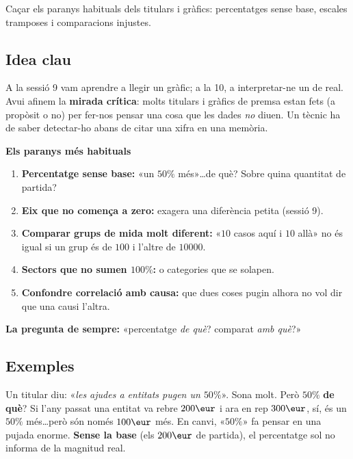 %
{Caçar els paranys habituals dels titulars i gràfics: percentatges sense base, escales tramposes i comparacions injustes.}

\subsection{Idea clau}

A la sessió 9 vam aprendre a llegir un gràfic; a la 10, a interpretar-ne un de real.
Avui afinem la \textbf{mirada crítica}: molts titulars i gràfics de premsa estan fets
(a propòsit o no) per fer-nos pensar una cosa que les dades \emph{no} diuen. Un tècnic
ha de saber detectar-ho abans de citar una xifra en una memòria.

\begin{idea}
\textbf{Els paranys més habituals}
\begin{enumerate}[leftmargin=1.6em, itemsep=2pt]
  \item \textbf{Percentatge sense base:} «un $50\%$ més»\dots de què? Sobre quina
        quantitat de partida?
  \item \textbf{Eix que no comença a zero:} exagera una diferència petita (sessió 9).
  \item \textbf{Comparar grups de mida molt diferent:} «$10$ casos aquí i $10$ allà»
        no és igual si un grup és de $100$ i l'altre de $\num{10000}$.
  \item \textbf{Sectors que no sumen $100\%$:} o categories que se solapen.
  \item \textbf{Confondre correlació amb causa:} que dues coses pugin alhora no vol dir
        que una causi l'altra.
\end{enumerate}
\textbf{La pregunta de sempre:} «percentatge \emph{de què}? comparat \emph{amb què}?»
\end{idea}

\subsection{Exemples}

\begin{exemple}
Un titular diu: «\emph{les ajudes a entitats pugen un $50\%$}». Sona molt. Però
$50\%$ \textbf{de què}? Si l'any passat una entitat va rebre $200\eur$ i ara en rep
$300\eur$, sí, és un $50\%$ més\dots però són només $100\eur$ més. En canvi, «$50\%$»
fa pensar en una pujada enorme. \textbf{Sense la base} (els $200\eur$ de partida), el
percentatge sol no informa de la magnitud real.
\end{exemple}

